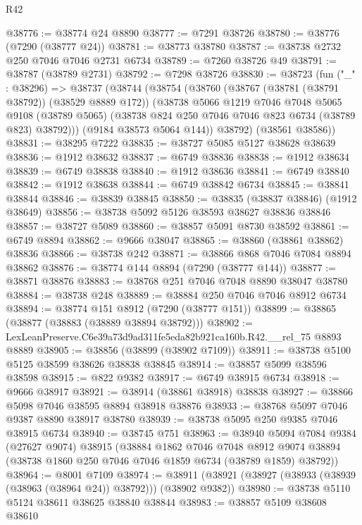 \begin{lexlean}{R42}
\begin{coremodule}
{@38776 := @38774 @24 @8890
@38777 := @7291 @38726
@38780 := @38776 (@7290 (@38777 @24))
@38781 := @38773 @38780
@38787 := @38738 @2732 @250 @7046 @7046 @2731 @6734
@38789 := @7260 @38726 @49
@38791 := @38787 (@38789 @2731)
@38792 := @7298 @38726
@38830 := @38723
    (fun ("_" : @38296) =>
    @38737
      (@38744
        (@38754
          (@38760
            (@38767 (@38781 (@38791 @38792)) (@38529 @8889 @172))
            (@38738
              @5066
              @1219
              @7046
              @7048
              @5065
              @9108
              (@38789 @5065)
              (@38738 @824 @250 @7046 @7046 @823 @6734 (@38789 @823) @38792)))
          (@9184 @38573 @5064 @144))
        @38792)
      (@38561 @38586))
@38831 := @38295 @7222
@38835 := @38727 @5085 @5127 @38628 @38639
@38836 := @1912 @38632
@38837 := @6749 @38836
@38838 := @1912 @38634
@38839 := @6749 @38838
@38840 := @1912 @38636
@38841 := @6749 @38840
@38842 := @1912 @38638
@38844 := @6749 @38842 @6734
@38845 := @38841 @38844
@38846 := @38839 @38845
@38850 := @38835 (@38837 @38846) (@1912 @38649)
@38856 := @38738 @5092 @5126 @38593 @38627 @38836 @38846
@38857 := @38727 @5089
@38860 := @38857 @5091 @8730 @38592
@38861 := @6749 @8894
@38862 := @9666 @38047
@38865 := @38860 (@38861 @38862) @38836
@38866 := @38738 @242
@38871 := @38866 @868 @7046 @7084 @8894 @38862
@38876 := @38774 @144 @8894 (@7290 (@38777 @144))
@38877 := @38871 @38876
@38883 := @38768 @251 @7046 @7048 @8890 @38047 @38780
@38884 := @38738 @248
@38889 := @38884 @250 @7046 @7046 @8912 @6734
@38894 := @38774 @151 @8912 (@7290 (@38777 @151))
@38899 := @38865 (@38877 (@38883 (@38889 @38894 @38792)))
@38902 := LexLeanPreserve.C6e39a73d9ad311fe5eda82b921ca160b.R42.__rel_75 @8893 @8889
@38905 := @38856 (@38899 (@38902 @7109))
@38911 := @38738 @5100 @5125 @38599 @38626 @38838 @38845
@38914 := @38857 @5099 @38596 @38598
@38915 := @822 @9382
@38917 := @6749 @38915 @6734
@38918 := @9666 @38917
@38921 := @38914 (@38861 @38918) @38838
@38927 := @38866 @5098 @7046 @38595 @8894 @38918 @38876
@38933 := @38768 @5097 @7046 @9387 @8890 @38917 @38780
@38939 := @38738 @5095 @250 @9385 @7046 @38915 @6734
@38940 := @38745 @751
@38963 := @38940
    @5094
    @7084
    @9384
    (@27627 @9074)
    @38915
    (@38884
      @1862
      @7046
      @7048
      @8912
      @9074
      @38894
      (@38738 @1860 @250 @7046 @7046 @1859 @6734 (@38789 @1859) @38792))
@38964 := @8001 @7109
@38974 := @38911 (@38921 (@38927 (@38933 (@38939 (@38963 (@38964 @24)) @38792))) (@38902 @9382))
@38980 := @38738 @5110 @5124 @38611 @38625 @38840 @38844
@38983 := @38857 @5109 @38608 @38610
}
\end{coremodule}
\end{lexlean}
